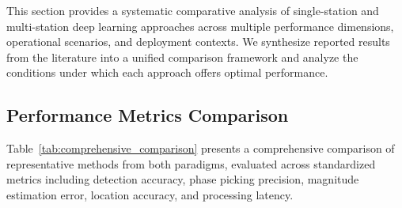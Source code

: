 \documentclass[review,authoryear]{elsarticle}
\begin{document}
This section provides a systematic comparative analysis of single-station and multi-station deep learning approaches across multiple performance dimensions, operational scenarios, and deployment contexts. We synthesize reported results from the literature into a unified comparison framework and analyze the conditions under which each approach offers optimal performance.

\subsection{Performance Metrics Comparison}

Table~\ref{tab:comprehensive_comparison} presents a comprehensive comparison of representative methods from both paradigms, evaluated across standardized metrics including detection accuracy, phase picking precision, magnitude estimation error, location accuracy, and processing latency.
\end{document}
